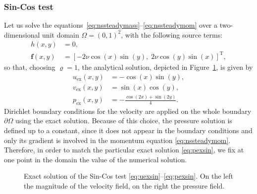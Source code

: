 \subsubsection{Sin-Cos test}
Let us solve the equations~\eqref{eq:nssteadymass}--\eqref{eq:nssteadymom} over 
a two-dimensional unit domain $\Omega=(0,1)^2$, with the following source terms:
\begin{align}
	h(x,y) &= 0,\\
	\mathbf{f}(x,y) &= [-2\nu \cos(x) \sin(y), \; 2\nu \cos(y) \sin(x)]^\mathrm{T},
\end{align}
so that, choosing $\varrho=1$, the analytical solution, depicted in 
Figure~\ref{fig:sincosexact}, is given by
\begin{align}
\label{eq:uexsin}	u_\text{ex}(x,y) &= -\cos(x)\sin(y),\\
	v_\text{ex}(x,y) &= \sin(x)\cos(y),\\
\label{eq:pexsin}	p_\text{ex}(x,y) &= -\frac{\cos(2x)+\sin(2y)}{4}.
\end{align}
Dirichlet boundary conditions for the velocity are applied on the whole 
boundary $\partial \Omega$ using the exact solution. Because of this choice, 
the pressure solution is defined up to a constant, since it does not appear in 
the boundary conditions and only its gradient is involved in the momentum 
equation \eqref{eq:nssteadymom}. Therefore, in order to match the particular 
exact solution \eqref{eq:pexsin}, we fix at one point in the domain the value 
of the numerical solution.
\begin{figure}
	\centering
	\caption[Exact solution of the Sin-Cos test]{Exact solution of the Sin-Cos 
	test \eqref{eq:uexsin}--\eqref{eq:pexsin}. On the left the magnitude of the 
	velocity field, on the right the 
	pressure field.}
	\label{fig:sincosexact}
\end{figure}

